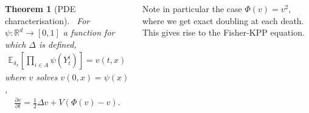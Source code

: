 \documentclass{tikzposter} %
\newcommand\pdiff[2]{\ensuremath{\frac{\partial #1}{\partial #2}}}
\newtheorem{theorem}{Theorem}
\begin{document}
\begin{columns}
{{    \begin{theorem}[PDE characterisation]
    \ For $\psi : \mathbb{R}^d \to [0,1]$ a function for which $\Delta$ is defined,
    \begin{align*}
      \mathbb{E}_{\delta_x}\left[\prod_{i \in A} \psi(Y^i_t)\right] = v(t, x)
    \end{align*}
    where $v$ solves $v(0, x) = \psi(x)$,
    \begin{align*}
      \pdiff{v}{t} = \frac{1}{2} \Delta v + V(\Phi(v) - v).
    \end{align*}
    \end{theorem}
    \hphantom{}

    Note in particular the case $\Phi(v) = v^2$, where we get exact doubling at each death. This gives rise to the Fisher-KPP equation.
    }

  }



\end{columns}
\end{document}
